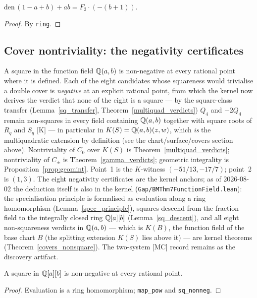 \begin{lemma}\label{pairing3}\leanok
{}
$\mathrm{den}\,(1-a+b)+ab=F_{3}\cdot(-(b+1))$.
\end{lemma}
\begin{proof}\leanok
By \texttt{ring}.
\end{proof}

\subsection*{Cover nontriviality: the negativity certificates}

A square in the function field $\mathbb{Q}(a,b)$ is non-negative at every rational point where it
is defined.  Each of the eight candidates whose squareness would trivialise a double
cover is \emph{negative} at an explicit rational point, from which the kernel now derives
the verdict that none of the eight is a square --- by the square-class transfer
(Lemma~\ref{sq_transfer}, Theorem~\ref{multiquad_verdicts}) $Q_{4}$ and $-2Q_{4}$
remain non-squares in every field containing $\mathbb{Q}(a,b)$ together with square roots
of $R_{q}$ and $S_{q}$ [K] --- in particular in $K(S)=\mathbb{Q}(a,b)(z,w)$, which \emph{is} the multiquadratic
extension by definition (see the chart/surface/covers section above).
Nontriviality of $C_{0}$ over $K(S)$ is Theorem~\ref{multiquad_verdicts};
nontriviality of $C_{\pm}$ is Theorem~\ref{gamma_verdicts}; geometric
integrality is Proposition~\ref{prop:geomint}.  Point~1 is the $K$-witness $(-51/13,-17/7)$; point~2 is $(1,3)$.  The eight negativity certificates are the kernel anchors; as of 2026-08-02 the
deduction itself is also in the kernel (\texttt{Gap/BMThm7FunctionField.lean}): the
specialisation principle is formalised as evaluation along a ring homomorphism
(Lemma~\ref{spec_principle}), squares descend from the fraction field to the
integrally closed ring $\mathbb{Q}[a][b]$ (Lemma~\ref{sq_descent}), and all eight
non-squareness verdicts in $\mathbb{Q}(a,b)$ --- which is $K(B)$, the function
field of the base chart $B$ (the splitting extension $K(S)$ lies above it) ---
are kernel theorems (Theorem~\ref{covers_nonsquare}).  The two-system [MC] record
remains as the discovery artifact.

\begin{lemma}\label{spec_principle}\leanok
A square in $\mathbb{Q}[a][b]$ is non-negative at every rational point.
\end{lemma}
\begin{proof}\leanok
Evaluation is a ring homomorphism; \texttt{map\_pow} and \texttt{sq\_nonneg}.
\end{proof}

